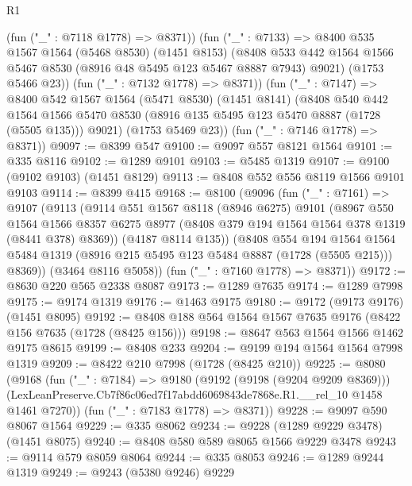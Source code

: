 \begin{lexlean}{R1}
\begin{coremodule}
          (fun ("_" : @7118 @1778) => @8371))
        (fun ("_" : @7133) =>
        @8400
          @535
          @1567
          @1564
          (@5468 @8530)
          (@1451 @8153)
          (@8408 @533 @442 @1564 @1566 @5467 @8530 (@8916 @48 @5495 @123 @5467 @8887 @7943) @9021)
          (@1753 @5466 @23))
        (fun ("_" : @7132 @1778) => @8371))
      (fun ("_" : @7147) =>
      @8400
        @542
        @1567
        @1564
        (@5471 @8530)
        (@1451 @8141)
        (@8408
          @540
          @442
          @1564
          @1566
          @5470
          @8530
          (@8916 @135 @5495 @123 @5470 @8887 (@1728 (@5505 @135)))
          @9021)
        (@1753 @5469 @23))
      (fun ("_" : @7146 @1778) => @8371))
@9097 := @8399 @547
@9100 := @9097 @557 @8121 @1564
@9101 := @335 @8116
@9102 := @1289 @9101
@9103 := @5485 @1319
@9107 := @9100 (@9102 @9103) (@1451 @8129)
@9113 := @8408 @552 @556 @8119 @1566 @9101 @9103
@9114 := @8399 @415
@9168 := @8100
    (@9096
      (fun ("_" : @7161) =>
      @9107
        (@9113
          (@9114
            @551
            @1567
            @8118
            (@8946 @6275)
            @9101
            (@8967
              @550
              @1564
              @1566
              @8357
              @6275
              @8977
              (@8408 @379 @194 @1564 @1564 @378 @1319 (@8441 @378) @8369))
            (@4187 @8114 @135))
          (@8408
            @554
            @194
            @1564
            @1564
            @5484
            @1319
            (@8916 @215 @5495 @123 @5484 @8887 (@1728 (@5505 @215)))
            @8369))
        (@3464 @8116 @5058))
      (fun ("_" : @7160 @1778) => @8371))
@9172 := @8630 @220 @565 @2338 @8087
@9173 := @1289 @7635
@9174 := @1289 @7998
@9175 := @9174 @1319
@9176 := @1463 @9175
@9180 := @9172 (@9173 @9176) (@1451 @8095)
@9192 := @8408 @188 @564 @1564 @1567 @7635 @9176 (@8422 @156 @7635 (@1728 (@8425 @156)))
@9198 := @8647 @563 @1564 @1566 @1462 @9175 @8615
@9199 := @8408 @233
@9204 := @9199 @194 @1564 @1564 @7998 @1319
@9209 := @8422 @210 @7998 (@1728 (@8425 @210))
@9225 := @8080
    (@9168
      (fun ("_" : @7184) =>
      @9180
        (@9192 (@9198 (@9204 @9209 @8369)))
        (LexLeanPreserve.Cb7f86c06ed7f17abdd6069843de7868e.R1.__rel_10 @1458 @1461 @7270))
      (fun ("_" : @7183 @1778) => @8371))
@9228 := @9097 @590 @8067 @1564
@9229 := @335 @8062
@9234 := @9228 (@1289 @9229 @3478) (@1451 @8075)
@9240 := @8408 @580 @589 @8065 @1566 @9229 @3478
@9243 := @9114 @579 @8059 @8064
@9244 := @335 @8053
@9246 := @1289 @9244 @1319
@9249 := @9243 (@5380 @9246) @9229

\end{coremodule}
\end{lexlean}

